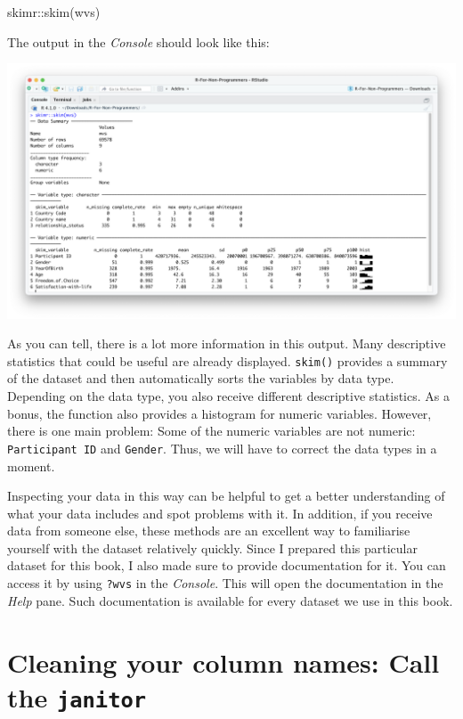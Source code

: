 \documentclass[
  letterpaper,
]{krantz}
\makeatletter
\newenvironment{Shaded}{\begin{snugshade}}{\end{snugshade}}
\newcommand{\FunctionTok}[1]{\textcolor[rgb]{0.28,0.35,0.67}{#1}}
\newcommand{\NormalTok}[1]{\textcolor[rgb]{0.00,0.23,0.31}{#1}}
\newcommand{\SpecialCharTok}[1]{\textcolor[rgb]{0.37,0.37,0.37}{#1}}
\newenvironment{kframe}{%
\medskip{}
\setlength{\fboxsep}{.8em}
 \def\at@end@of@kframe{}%
 \ifinner\ifhmode%
  \def\at@end@of@kframe{\end{minipage}}%
  \begin{minipage}{\columnwidth}%
 \fi\fi%
 \def\FrameCommand##1{\hskip\@totalleftmargin \hskip-\fboxsep
 \colorbox{shadecolor}{##1}\hskip-\fboxsep
     \hskip-\linewidth \hskip-\@totalleftmargin \hskip\columnwidth}%
 \MakeFramed {\advance\hsize-\width
   \@totalleftmargin\z@ \linewidth\hsize
   \@setminipage}}%
 {\par\unskip\endMakeFramed%
 \at@end@of@kframe}
\renewenvironment{Shaded}{\begin{kframe}}{\end{kframe}}
\makeatother
\begin{document}
\begin{Shaded}
\begin{Highlighting}[]
\NormalTok{skimr}\SpecialCharTok{::}\FunctionTok{skim}\NormalTok{(wvs)}
\end{Highlighting}
\end{Shaded}

The output in the \emph{Console} should look like this:

\includegraphics{images/chapter_07_img/02_skimr_output/skimr_output.png}

As you can tell, there is a lot more information in this output. Many
descriptive statistics that could be useful are already displayed.
\texttt{skim()} provides a summary of the dataset and then automatically
sorts the variables by data type. Depending on the data type, you also
receive different descriptive statistics. As a bonus, the function also
provides a histogram for numeric variables. However, there is one main
problem: Some of the numeric variables are not numeric:
\texttt{Participant\ ID} and \texttt{Gender}. Thus, we will have to
correct the data types in a moment.

Inspecting your data in this way can be helpful to get a better
understanding of what your data includes and spot problems with it. In
addition, if you receive data from someone else, these methods are an
excellent way to familiarise yourself with the dataset relatively
quickly. Since I prepared this particular dataset for this book, I also
made sure to provide documentation for it. You can access it by using
\texttt{?wvs} in the \emph{Console}. This will open the documentation in
the \emph{Help} pane. Such documentation is available for every dataset
we use in this book.

\section{\texorpdfstring{Cleaning your column names: Call the
\texttt{janitor}}{Cleaning your column names: Call the janitor}}\label{colnames-cleaning}
\end{document}
